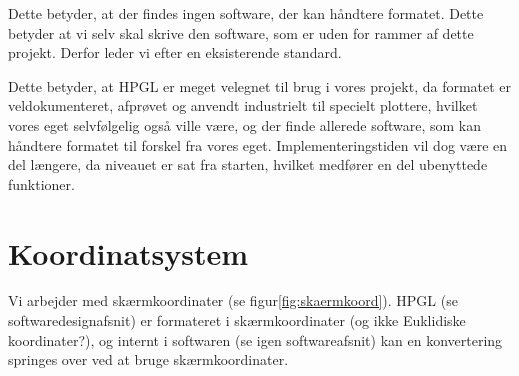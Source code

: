 Dette betyder, at der findes ingen software, der kan håndtere
formatet. Dette betyder at vi selv skal skrive den software, som er
uden for rammer af dette projekt. Derfor leder vi efter en
eksisterende standard.


Dette betyder, at HPGL er meget velegnet til brug i vores projekt, da
formatet er veldokumenteret, afprøvet og anvendt industrielt til
specielt plottere, hvilket vores eget selvfølgelig også ville være, og
der finde allerede software, som kan håndtere formatet til forskel fra
vores eget. Implementeringstiden vil dog være en del længere, da
niveauet er sat fra starten, hvilket medfører en del ubenyttede
funktioner.


\section{Koordinatsystem}


Vi arbejder med skærmkoordinater (se
figur\vref{fig:skaermkoord}). HPGL (se
softwaredesignafsnit) er formateret i
skærmkoordinater (og ikke Euklidiske koordinater?),
og internt i softwaren (se igen
softwareafsnit) kan en konvertering
springes over ved at bruge skærmkoordinater.



